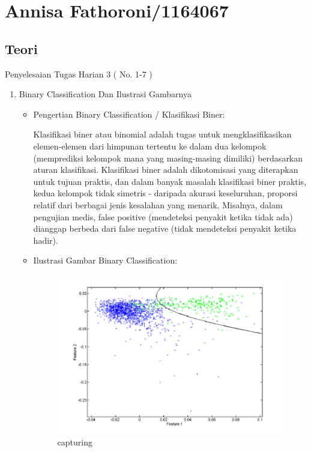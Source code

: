 \section{Annisa Fathoroni/1164067}
\subsection{Teori}
Penyelesaian Tugas Harian 3 ( No. 1-7 )
\begin{enumerate}
\item Binary Classification Dan Ilustrasi Gambarnya
\begin{itemize}
\item Pengertian Binary Classification / Klasifikasi Biner:

Klasifikasi biner atau binomial adalah tugas untuk mengklasifikasikan elemen-elemen dari himpunan tertentu ke dalam dua kelompok (memprediksi kelompok mana yang masing-masing dimiliki) berdasarkan aturan klasifikasi. Klasifikasi biner adalah dikotomisasi yang diterapkan untuk tujuan praktis, dan dalam banyak masalah klasifikasi biner praktis, kedua kelompok tidak simetris - daripada akurasi keseluruhan, proporsi relatif dari berbagai jenis kesalahan yang menarik. Misalnya, dalam pengujian medis, false positive (mendeteksi penyakit ketika tidak ada) dianggap berbeda dari false negative (tidak mendeteksi penyakit ketika hadir).

\item Ilustrasi Gambar Binary Classification:

\begin{figure}[ht]
\centering
\includegraphics[scale=0.5]{figures/Chapter2-AnnisaFathoroni1.png}
\caption{capturing}
\label{contoh}
\end{figure}
\end{itemize}


\end{enumerate}
